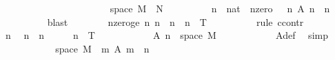 \begin{isabellebody}
\ \ \ \ \isamarkupfalse%
\isanewline
\ \ \ \ \isacommand{{\isacharbraceleft}{\kern0pt}}\isamarkupfalse%
\isanewline
\ \ \ \ \ \ \isamarkupfalse%
\ {\isasymomega}\ \isamarkupfalse%
\ {\isasymomega}{\isacharcolon}{\kern0pt}\ {\isachardoublequoteopen}{\isasymomega}\ {\isasymin}\ space\ {\isacharquery}{\kern0pt}M\ {\isacharminus}{\kern0pt}\ {\isacharquery}{\kern0pt}N{\isachardoublequoteclose}\isanewline
\ \ \ \ \ \ \isamarkupfalse%
\ \isamarkupfalse%
\ n\ {\isacharcolon}{\kern0pt}{\isacharcolon}{\kern0pt}\ nat\ \ n{\isacharunderscore}{\kern0pt}zero{\isacharcolon}{\kern0pt}\ {\isachardoublequoteopen}{\isasymomega}\ {\isasymnotin}\ {\isacharparenleft}{\kern0pt}{\isasymUnion}n{\isachardot}{\kern0pt}\ A\ {\isacharparenleft}{\kern0pt}n\ {\isacharplus}{\kern0pt}\ n\isanewline
\ \ \ \ \ \ \ \ \isamarkupfalse%
\ blast\isanewline
\ \ \ \ \ \ \isamarkupfalse%
\ nzero{\isacharunderscore}{\kern0pt}ge{\isacharcolon}{\kern0pt}\ {\isachardoublequoteopen}{\isasymAnd}n{\isachardot}{\kern0pt}\ n\ {\isasymge}\ n\ {\isasymLongrightarrow}\ {}{\isacharcircum}{\kern0pt}n\ {\isacharasterisk}{\kern0pt}\ T\ {\isasymge}\ {}{\isachardoublequoteclose}\isanewline
\ \ \ \ \ \ \isamarkupfalse%
\ {\isacharparenleft}{\kern0pt}rule\ ccontr{\isacharparenright}{\kern0pt}\isanewline
\ \ \ \ \ \ \ \ \isamarkupfalse%
\ n\ \isamarkupfalse%
\ {\isachardoublequoteopen}n\ {\isasymle}\ n{\isachardoublequoteclose}\ {\isachardoublequoteopen}{\isasymnot}\ {}\ {\isasymle}\ {}\ {\isacharcircum}{\kern0pt}\ n\ {\isacharasterisk}{\kern0pt}\ T{\isachardoublequoteclose}\isanewline
\ \ \ \ \ \ \ \ \isamarkupfalse%
\ \isamarkupfalse%
\ {\isachardoublequoteopen}A\ n\ {\isacharequal}{\kern0pt}\ space\ {\isacharquery}{\kern0pt}M{\isachardoublequoteclose}\isanewline
\ \ \ \ \ \ \ \ \ \ \isamarkupfalse%
\ A{\isacharunderscore}{\kern0pt}def\ \isamarkupfalse%
\ simp\isanewline
\ \ \ \ \ \ \ \ \isamarkupfalse%
\ \isamarkupfalse%
\ {\isachardoublequoteopen}space\ {\isacharquery}{\kern0pt}M\ {\isasymsubseteq}\ {\isacharparenleft}{\kern0pt}{\isasymUnion}m{\isachardot}{\kern0pt}\ A\ {\isacharparenleft}{\kern0pt}m\ {\isacharplus}{\kern0pt}\ n{\isacharparenright}{\kern0pt}{\isacharparenright}{\kern0pt}{\isachardoublequoteclose}\isanewline

\end{isabellebody}
